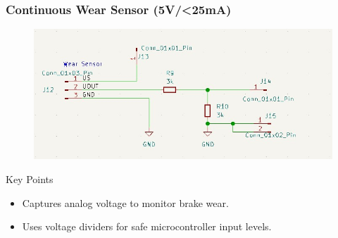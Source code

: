 \documentclass[8pt,compress]{beamer}
\begin{document}
\begin{frame}
  \frametitle{Continuous Wear Sensor (5V/<25mA)}
  \begin{minipage}{0.65\textwidth}
    \begin{figure}
      \includegraphics[width=\textwidth]{assets/electronic/wear_schem.jpg}
    \end{figure}
  \end{minipage}
  \hfill
  \begin{minipage}{0.3\textwidth}
    \begin{block}{Key Points}
      \begin{itemize}
        \item Captures analog voltage  to monitor brake wear.
        \item Uses voltage dividers for safe microcontroller input levels.
      \end{itemize}
    \end{block}
  \end{minipage}
\end{frame}
\end{document}
